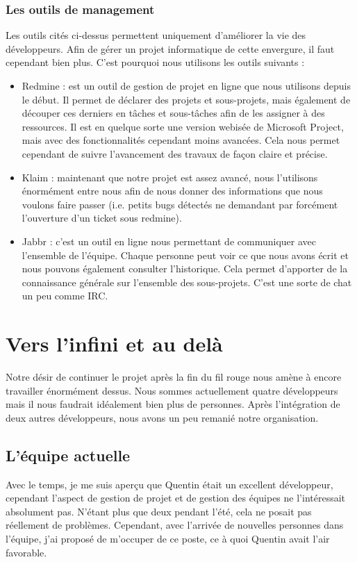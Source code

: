 \documentclass{article}
\begin{document}
\subsubsection{Les outils de management}
		Les outils cités ci-dessus permettent uniquement d'améliorer la vie des développeurs. Afin de gérer un projet informatique de cette envergure, il faut cependant bien plus. C'est pourquoi nous utilisons les outils suivants : 
		\begin{itemize}
			\item Redmine : est un outil de gestion de projet en ligne que nous utilisons depuis le début. Il permet de déclarer des projets et sous-projets, mais également de découper ces derniers en tâches et sous-tâches afin de les assigner à des ressources. Il est en quelque sorte une version webisée de Microsoft Project, mais avec des fonctionnalités cependant moins avancées. Cela nous permet cependant de suivre l'avancement des travaux de façon claire et précise.
			\item Klaim : maintenant que notre projet est assez avancé, nous l'utilisons énormément entre nous afin de nous donner des informations que nous voulons faire passer (i.e. petits bugs détectés ne demandant par forcément l'ouverture d'un ticket sous redmine).
			\item Jabbr : c'est un outil en ligne nous permettant de communiquer avec l'ensemble de l'équipe. Chaque personne peut voir ce que nous avons écrit et nous pouvons également consulter l'historique. Cela permet d'apporter de la connaissance générale sur l'ensemble des sous-projets. C'est une sorte de chat un peu comme IRC.
		\end{itemize}

\section{Vers l'infini et au delà}

	Notre désir de continuer le projet après la fin du fil rouge nous amène à encore travailler énormément dessus. Nous sommes actuellement quatre développeurs mais il nous faudrait idéalement bien plus de personnes. Après l'intégration de deux autres développeurs, nous avons un peu remanié notre organisation.

	\subsection{L'équipe actuelle}
	Avec le temps, je me suis aperçu que Quentin était un excellent développeur, cependant l'aspect de gestion de projet et de gestion des équipes ne l'intéressait absolument pas. N'étant plus que deux pendant l'été, cela ne posait pas réellement de problèmes. Cependant, avec l'arrivée de nouvelles personnes dans l'équipe, j'ai proposé de m'occuper de ce poste, ce à quoi Quentin avait l'air favorable. 
\end{document}
